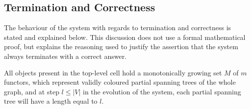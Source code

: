 \subsection{Termination and Correctness}
The behaviour of the system with regards to termination and correctness is stated and explained below.  This discussion does not use a formal mathematical proof, but explains the reasoning used to justify the assertion that the system always terminates with a correct answer.

\begin{proposition}\label{prop:grow}
All \bo{} objects present in the top-level cell hold a monotonically growing set \(M\) of \(m\) functors, which represent validly coloured partial spanning trees of the whole graph, and at step \(l \leq |V|\) in the evolution of the system, each partial spanning tree will have a length equal to \(l\).
\end{proposition}

